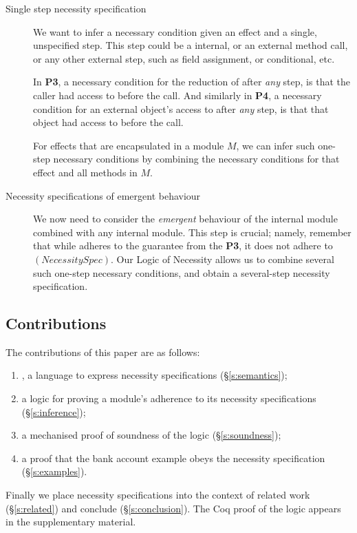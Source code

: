 \begin{description}
  
\item[Single step necessity specification]
We want to infer
a necessary condition given an effect and
a single, unspecified step. This step could be a internal, or an external method call,
or any other external step, such as field assignment, or conditional, etc.

In \textbf{P3},   a necessary condition for the  reduction of   after \emph{any}
step, is that the caller  had access to  before the call.
And similarly in \textbf{P4},   a necessary condition for an external object's
access to   after \emph{any}
step, is that that object had access to  before the call.

For effects that are encapsulated in a module $M$, we can infer such one-step
necessary conditions by combining the necessary conditions for that effect and 
all   methods in $M$.



\item[Necessity specifications of emergent behaviour]
  
We now need to consider the \emph{emergent} behaviour of the internal module
combined with any internal module. This step is crucial; namely, remember that while  adheres to
the guarantee from the \textbf{P3}, it does not adhere to  $(NecessitySpec)$.   
Our Logic of Necessity allows us to combine  several such one-step necessary conditions, and obtain a several-step necessity specification.
 
\end{description} 


\subsection{Contributions}

The contributions of this paper are as follows:
 
 \begin{enumerate}
 \item
\Chainmail, a language to
express necessity specifications (\S\ref{s:semantics});
 \item
a logic for proving a module's adherence to its
necessity specifications (\S\ref{s:inference});
\item
  a mechanised  proof of soundness of the logic (\S\ref{s:soundness});
\item
  a  proof that the bank account example obeys the necessity
  specification (\S\ref{s:examples}).
\end{enumerate}


\noindent Finally we place necessity specifications into the context
of related work (\S\ref{s:related}) and conclude (\S\ref{s:conclusion}).
The Coq proof of the logic appears in the
supplementary material.
